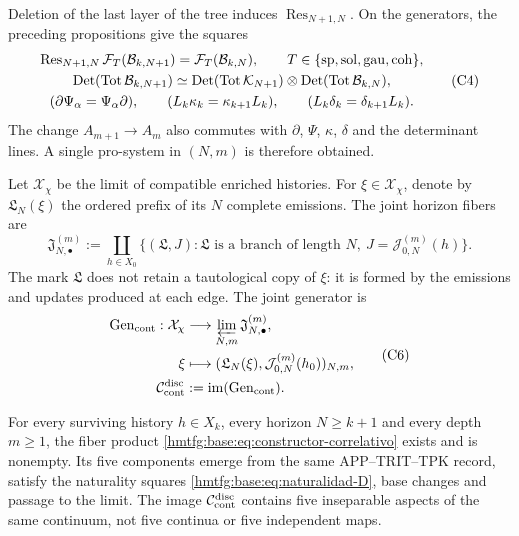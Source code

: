 Deletion of the last layer of the tree induces \(\operatorname{Res}_{N+1,N}\). On the generators, the preceding propositions give the squares
\[
\begin{gathered}
 \operatorname{Res}_{N+1,N}\mathcal F_T(\mathcal B_{k,N+1})
 =\mathcal F_T(\mathcal B_{k,N}),
 \qquad T\in\{{\rm sp},{\rm sol},{\rm gau},{\rm coh}\},\\
 \operatorname{Det}(\operatorname{Tot}\mathcal B_{k,N+1})
 \simeq
 \operatorname{Det}(\operatorname{Tot}\mathcal K_{N+1})
 \otimes
 \operatorname{Det}(\operatorname{Tot}\mathcal B_{k,N}),\\
 (\partial\Psi_\alpha=\Psi_\alpha\partial),\qquad
 (L_k\kappa_k=\kappa_{k+1}L_k),\qquad
 (L_k\delta_k=\delta_{k+1}L_k).
\end{gathered}
 \tag{C4}
 \label{hmtfg:base:eq:naturalidad-D}
\]
The change \(A_{m+1}\to A_m\) also commutes with \(\partial\), \(\Psi\), \(\kappa\), \(\delta\) and the determinant lines. A single pro-system in \((N,m)\) is therefore obtained.

Let \(\mathcal X_\chi\) be the limit of compatible enriched histories. For \(\xi\in\mathcal X_\chi\), denote by \(\mathfrak L_N(\xi)\) the ordered prefix of its \(N\) complete emissions. The joint horizon fibers are
\[
 \mathfrak J_{N,\bullet}^{(m)}
 :=\coprod_{h\in X_0}
 \{(\mathfrak L,J):\mathfrak L\text{ is a branch of length }N,
       \ J=\mathcal J_{0,N}^{(m)}(h)\}.
 \tag{C5}
 \label{hmtfg:base:eq:fibras-conjuntas-horizonte}
\]
The mark \(\mathfrak L\) does not retain a tautological copy of \(\xi\): it is formed by the emissions and updates produced at each edge. The joint generator is
\[
\begin{aligned}
 \operatorname{Gen}_{\rm cont}:\mathcal X_\chi
   &\longrightarrow\varprojlim_{N,m}\mathfrak J_{N,\bullet}^{(m)},\\
 \xi&\longmapsto
   (\mathfrak L_N(\xi),\mathcal J_{0,N}^{(m)}(h_0))_{N,m},\\
 \mathcal C_{\rm cont}^{\rm disc}
   &:=\operatorname{im}(\operatorname{Gen}_{\rm cont}).
\end{aligned}
 \tag{C6}
 \label{hmtfg:base:eq:continuo-discreto}
\]

\begin{theorem}
\label{hmtfg:base:thm:correlacion-cinco}
For every surviving history \(h\in X_k\), every horizon \(N\geq k+1\) and every depth \(m\geq1\), the fiber product \eqref{hmtfg:base:eq:constructor-correlativo} exists and is nonempty. Its five components emerge from the same APP--TRIT--TPK record, satisfy the naturality squares \eqref{hmtfg:base:eq:naturalidad-D}, base changes and passage to the limit. The image \(\mathcal C_{\rm cont}^{\rm disc}\) contains five inseparable aspects of the same continuum, not five continua or five independent maps.
\end{theorem}

